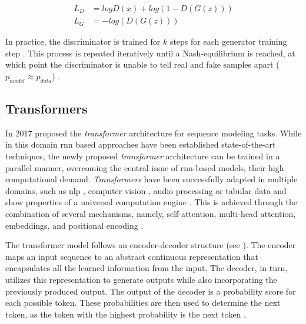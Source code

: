 \begin{equation}
  \begin{align}
  \label{eqn:gan-loss}
  L_D&=logD(x)+log(1-D(G(z)))\\
  L_G&=-log(D(G(z)))
\end{align}
\end{equation}


In practice, the discriminator is trained for $k$ steps for each generator training step \cite{aggarwal2018NeuralNetworksDeep}.
This process is repeated iteratively until a Nash-equilibrium is reached, at which point the discriminator is unable to tell real and fake samples apart ($p_{model}\approx p_{data}$) \cite{NIPS2014_5ca3e9b1, aggarwal2018NeuralNetworksDeep}.

\subsection{Transformers}
\label{ch:preliminaries-transformers}

In 2017 \textcite{vaswani2017AttentionAllYou} proposed the \textit{transformer} architecture for sequence modeling tasks.
While in this domain \gls{rnn} based approaches have been established state-of-the-art techniques, the newly proposed \textit{transformer} architecture can be trained in a parallel manner,
overcoming the central issue of \gls{rnn}-based models, their high computational demand.
\textit{Transformers} have been successfully adapted in multiple domains, such as \gls{nlp} \cite{gillioz2020OverviewTransformerbasedModels}, computer vision \cite{khan2022TransformersVisionSurvey}, audio processing \cite{gong2022SSASTSelfSupervisedAudio} or 
tabular data \cite{huang2020TabTransformerTabularData} and show properties of a universal computation engine \cite{lu2021PretrainedTransformersUniversal, lin2022SurveyTransformers}.
This is achieved through the combination of several mechanisms, namely, self-attention, multi-head attention, embeddings, and positional encoding \cite{vaswani2017AttentionAllYou}.

The transformer model follows an encoder-decoder structure (see ).
The encoder maps an input sequence to an abstract continuous representation that encapsulates all the learned information from the input.
The decoder, in turn, utilizes this representation to generate outputs while also incorporating the previously produced output.
The output of the decoder is a probability score for each possible token.
These probabilities are then used to determine the next token, as the token with the highest probability is the next token \cite{vaswani2017AttentionAllYou}. 

